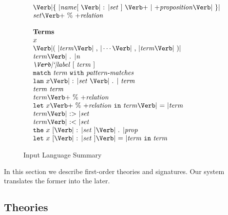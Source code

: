 \begin{figure*}[t]
\[\begin{array}[t]{l}
\LBRACE \Ident [\ \COLON \Setexp\ ]\ \BAR \Proposition \RBRACE\\
\Setexp \PERCENT \metav{relation}\\
\\
\mbox{\textbf{Terms}}\\
x\\
\LPAREN \Term\COMMA \cdots \COMMA \Term \RPAREN\\
\Term\PERIOD \metav{n}\\
\Label\ [\ \Term\ ]\\
\MATCH\ \Term\ \WITH\ \mbox{\textit{pattern-matches}}\\
\LAMBDA\ x\COLON\Set\ \PERIOD\ \Term\\
\Term\ \Term\\
\Term \PERCENT \metav{relation}\\
\LET\ x \PERCENT \metav{relation}\ \IN\ \Term\EQUALS\Term\\
\Term \SUBIN \Set\\
\Term \SUBOUT \Set\\
\THE\ x\ [\COLON\Set\ ] \PERIOD \Prop\\
\LET\ x\ [\COLON\Set\ ] \EQUALS\Term\ \IN\ \Term\\
\end{array}
\]  
\caption{Input Language Summary}
\label{fig:input}  
\end{figure*}

In this section we describe first-order theories and signatures.
Our system translates the former into the later.

\subsection{Theories}
\label{sec:theories}

